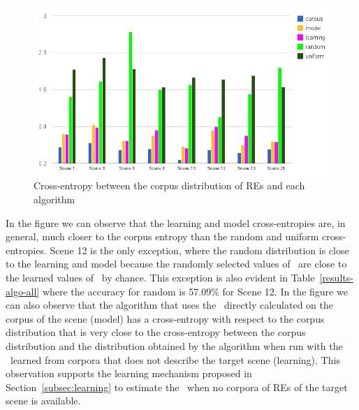 \begin{figure}[h!]
\begin{center}
\includegraphics[width=.9\textwidth]{images/entropy.jpg}
\end{center}
\vspace*{-2em}
\caption{Cross-entropy between the corpus distribution of REs and each algorithm}\label{Entropy}
\end{figure}

In the figure we can observe that the learning and model cross-entropies are, in general, much closer to the corpus entropy than the random and uniform cross-entropies. Scene 12 is the only exception, where the random distribution is close to the learning and model because the randomly selected values of \puse\ are close to the learned values of \puse\ by chance. This exception is also evident in Table~\ref{results-algo-all} where the accuracy for random is 57.09\% for Scene 12.
In the figure we can also observe that the algorithm that uses the \puse\ directly calculated on the corpus of the scene (model) has a cross-entropy with respect to the corpus distribution that is very close to the cross-entropy between the corpus distribution and the distribution obtained by the algorithm when run with the \puse\ learned from corpora that does not describe the target scene (learning). This observation supports the learning mechanism proposed in Section~\ref{subsec:learning} to estimate the \puse\ when no corpora of REs of the target scene is available. 
